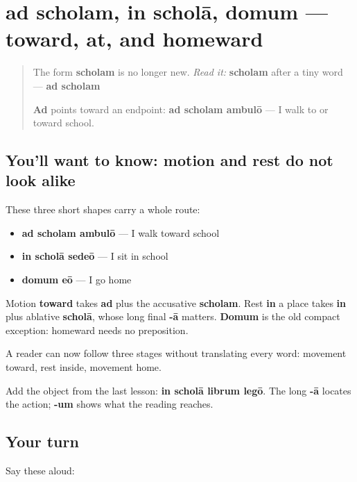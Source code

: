 \section[ad scholam; in scholā; domum]{ad scholam, in scholā, domum — toward, at, and homeward}

\label{lesson:LA-C59-place}



\begin{quote}
The form \textbf{scholam} is no longer new. \emph{Read it:} \textbf{scholam} after a tiny word — \textbf{ad scholam}

\textbf{Ad} points toward an endpoint: \textbf{ad scholam ambulō} — I walk to or toward school.
\end{quote}

\subsection*{You'll want to know: motion and rest do not look alike}
These three short shapes carry a whole route:

\begin{itemize}
\raggedright
  \item \textbf{ad scholam ambulō} — I walk toward school
  \item \textbf{in scholā sedeō} — I sit in school
  \item \textbf{domum eō} — I go home
\end{itemize}

Motion \textbf{toward} takes \textbf{ad} plus the accusative \textbf{scholam}. Rest \textbf{in} a place takes \textbf{in} plus ablative \textbf{scholā}, whose long final \textbf{-ā} matters. \textbf{Domum} is the old compact exception: homeward needs no preposition.

\begin{grammarlens}[title={Grammar Lens: follow the case, then the journey}]
A reader can now follow three stages without translating every word: movement toward, rest inside, movement home.

Add the object from the last lesson: \textbf{in scholā librum legō}. The long \textbf{-ā} locates the action; \textbf{-um} shows what the reading reaches.
\end{grammarlens}

\subsection*{Your turn}
Say these aloud:

